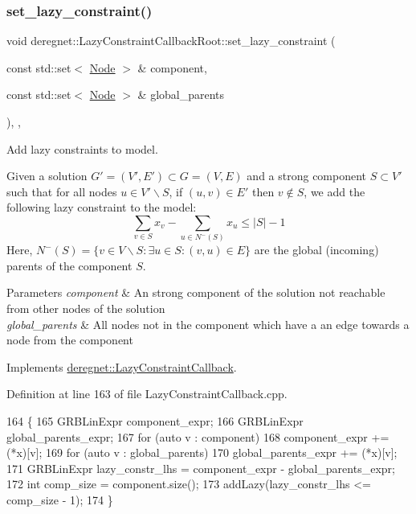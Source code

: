 \subsubsection{\texorpdfstring{set\+\_\+lazy\+\_\+constraint()}{set\_lazy\_constraint()}}
{\footnotesize\ttfamily void deregnet\+::\+Lazy\+Constraint\+Callback\+Root\+::set\+\_\+lazy\+\_\+constraint (\begin{DoxyParamCaption}\item[{const std\+::set$<$ \hyperlink{namespacederegnet_a744bad34f2de9856d36715a445f027f3}{Node} $>$ \&}]{component,  }\item[{const std\+::set$<$ \hyperlink{namespacederegnet_a744bad34f2de9856d36715a445f027f3}{Node} $>$ \&}]{global\+\_\+parents }\end{DoxyParamCaption})\hspace{0.3cm}{\ttfamily [override]}, {\ttfamily [private]}, {\ttfamily [virtual]}}



Add lazy constraints to model. 

Given a solution $G'=(V',E') \subset G=(V,E)$ and a strong component $S \subset V'$ such that for all nodes $u \in V' \backslash S $, if $(u,v) \in E'$ then $v \notin S$, we add the following lazy constraint to the model\+: \[ \begin{equation} \displaystyle \sum_{v \in S} x_v - \displaystyle \sum_{u \in N^{-}(S)} x_u \leq |S| - 1 \end{equation} \] Here, $N^{-}(S) = \{v \in V \backslash S: \exists u \in S: (v,u) \in E \} $ are the global (incoming) parents of the component $S$.


\begin{DoxyParams}{Parameters}
{\em component} & An strong component of the solution not reachable from other nodes of the solution \\
\hline
{\em global\+\_\+parents} & All nodes not in the component which have a an edge towards a node from the component \\
\hline
\end{DoxyParams}


Implements \hyperlink{classderegnet_1_1LazyConstraintCallback_a8f6db7da84271afcd2e2169318569558}{deregnet\+::\+Lazy\+Constraint\+Callback}.



Definition at line 163 of file Lazy\+Constraint\+Callback.\+cpp.


\begin{DoxyCode}
164                                                                                          \{
165     GRBLinExpr component\_expr;
166     GRBLinExpr global\_parents\_expr;
167     \textcolor{keywordflow}{for} (\textcolor{keyword}{auto} v : component)
168         component\_expr += (*x)[v];
169     \textcolor{keywordflow}{for} (\textcolor{keyword}{auto} v : global\_parents)
170         global\_parents\_expr += (*x)[v];
171     GRBLinExpr lazy\_constr\_lhs = component\_expr - global\_parents\_expr;
172     \textcolor{keywordtype}{int} comp\_size = component.size();
173     addLazy(lazy\_constr\_lhs <= comp\_size - 1);
174 \}
\end{DoxyCode}


